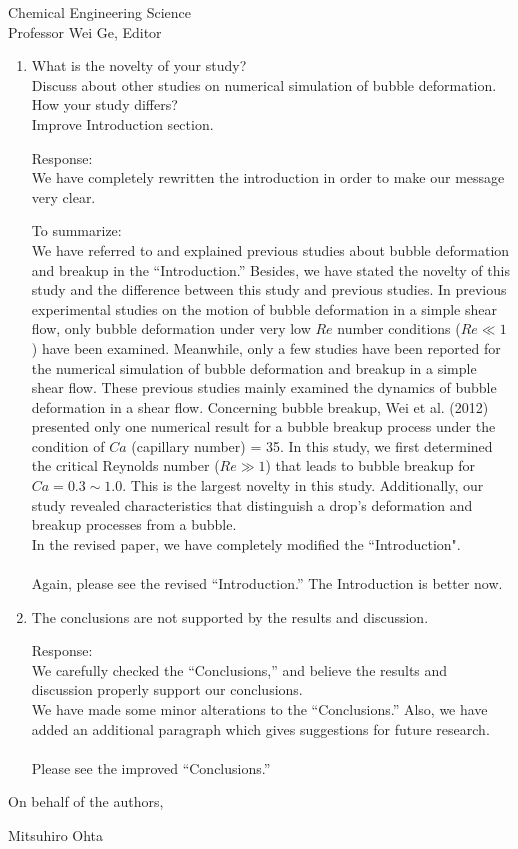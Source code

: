 \documentclass{letter}
\begin{document}
\begin{letter}{
Chemical Engineering Science\\
Professor Wei Ge, Editor\\}
\begin{enumerate}
\par\noindent
\item
\textsf
{What is the novelty of your study?\\
Discuss about other studies on numerical simulation of bubble deformation. How your study differs?\\
Improve Introduction section.\\}
\vspace{3 mm}

Response: \\
We have completely rewritten the introduction in order to make our message very clear.
\par
To summarize: \\
We have referred to and explained previous studies about bubble deformation and breakup in the ``Introduction.''
Besides, we have stated the novelty of this study and the difference between this study and previous studies.
In previous experimental studies on the motion of bubble deformation in a simple shear flow, only bubble deformation under very 
low $Re$ number conditions ($Re \ll 1$) have been examined.  
Meanwhile, only a few studies have been reported for the numerical simulation of bubble deformation and breakup in a simple shear flow.
These previous studies mainly examined the dynamics of bubble deformation in a shear flow.
Concerning bubble breakup, Wei et al. (2012) presented only one numerical result for a bubble breakup process under 
the condition of $Ca$ (capillary number) = 35.  
In this study, we first determined the critical Reynolds number ($Re \gg 1$) that leads to bubble breakup for $Ca = 0.3 \sim 1.0$.
This is the largest novelty in this study.
Additionally, our study revealed characteristics that distinguish a drop's deformation and breakup processes from a bubble.\\
In the revised paper, we have completely modified the ``Introduction".  \\
\\
Again, please see the revised ``Introduction.''  The Introduction is better now.
\\

\par\noindent
\item
\textsf
{The conclusions are not supported by the results and discussion.}
\vspace{3 mm}

Response: \\
We carefully checked the ``Conclusions,'' and believe the results and discussion properly support our conclusions.\\
We have made some minor alterations to the ``Conclusions.'' Also, we have added an additional paragraph which gives suggestions for future research. \\
\\
Please see the improved ``Conclusions.'' 
\\


\end{enumerate}

\closing{On behalf of the authors,}
Mitsuhiro Ohta

\end{letter}
\end{document}
